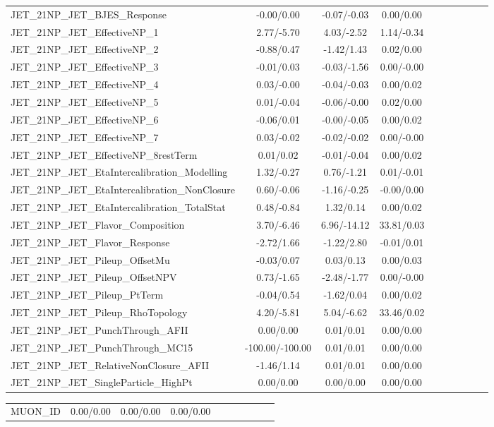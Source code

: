 \begin{table}[h]
\begin{center}
\begin{tabular}{l|ccccccccc}
JET\_21NP\_JET\_BJES\_Response &-0.00/0.00 &-0.07/-0.03 &0.00/0.00 \\
JET\_21NP\_JET\_EffectiveNP\_1 &2.77/-5.70 &4.03/-2.52 &1.14/-0.34 \\
JET\_21NP\_JET\_EffectiveNP\_2 &-0.88/0.47 &-1.42/1.43 &0.02/0.00 \\
JET\_21NP\_JET\_EffectiveNP\_3 &-0.01/0.03 &-0.03/-1.56 &0.00/-0.00 \\
JET\_21NP\_JET\_EffectiveNP\_4 &0.03/-0.00 &-0.04/-0.03 &0.00/0.02 \\
JET\_21NP\_JET\_EffectiveNP\_5 &0.01/-0.04 &-0.06/-0.00 &0.02/0.00 \\
JET\_21NP\_JET\_EffectiveNP\_6 &-0.06/0.01 &-0.00/-0.05 &0.00/0.02 \\
JET\_21NP\_JET\_EffectiveNP\_7 &0.03/-0.02 &-0.02/-0.02 &0.00/-0.00 \\
JET\_21NP\_JET\_EffectiveNP\_8restTerm &0.01/0.02 &-0.01/-0.04 &0.00/0.02 \\
JET\_21NP\_JET\_EtaIntercalibration\_Modelling &1.32/-0.27 &0.76/-1.21 &0.01/-0.01 \\
JET\_21NP\_JET\_EtaIntercalibration\_NonClosure &0.60/-0.06 &-1.16/-0.25 &-0.00/0.00 \\
JET\_21NP\_JET\_EtaIntercalibration\_TotalStat &0.48/-0.84 &1.32/0.14 &0.00/0.02 \\
JET\_21NP\_JET\_Flavor\_Composition &3.70/-6.46 &6.96/-14.12 &33.81/0.03 \\
JET\_21NP\_JET\_Flavor\_Response &-2.72/1.66 &-1.22/2.80 &-0.01/0.01 \\
JET\_21NP\_JET\_Pileup\_OffsetMu &-0.03/0.07 &0.03/0.13 &0.00/0.03 \\
JET\_21NP\_JET\_Pileup\_OffsetNPV &0.73/-1.65 &-2.48/-1.77 &0.00/-0.00 \\
JET\_21NP\_JET\_Pileup\_PtTerm &-0.04/0.54 &-1.62/0.04 &0.00/0.02 \\
JET\_21NP\_JET\_Pileup\_RhoTopology &4.20/-5.81 &5.04/-6.62 &33.46/0.02 \\
JET\_21NP\_JET\_PunchThrough\_AFII &0.00/0.00 &0.01/0.01 &0.00/0.00 \\
JET\_21NP\_JET\_PunchThrough\_MC15 &-100.00/-100.00 &0.01/0.01 &0.00/0.00 \\
JET\_21NP\_JET\_RelativeNonClosure\_AFII &-1.46/1.14 &0.01/0.01 &0.00/0.00 \\
JET\_21NP\_JET\_SingleParticle\_HighPt &0.00/0.00 &0.00/0.00 &0.00/0.00 \\
\hline \end{tabular} \end{center} \end{table} \begin{table}[h] \scriptsize \begin{center} \begin{tabular}{l|ccccccccc} \hline MUON\_ID &0.00/0.00 &0.00/0.00 &0.00/0.00 \\

\end{tabular}
\end{center}
\end{table}

